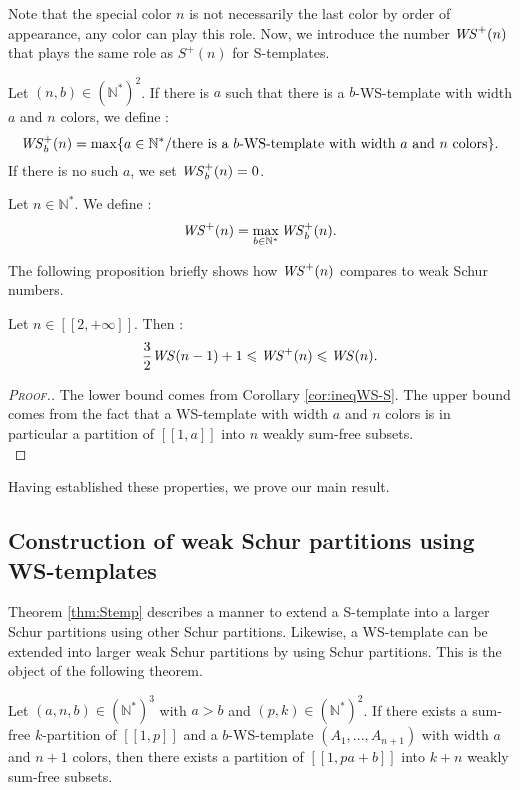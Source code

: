 Note that the special color \(n\) is not necessarily the last color by order of appearance, any color can play this role.
Now, we introduce the number \(\mathit{WS}^+(n)\) that plays the same role as \(S^+(n)\) for S-templates. 

\begin{definition}
Let \( (n,b) \in (\mathbb{N}^*)^2\). If there is \(a\) such that there is a \(b\)-WS-template with width \(a\)
and \(n\) colors, we define :
\[
\mathit{WS}_b^+(n)= \max \{a \in \mathbb{N}^*/ \text{there is a } b \text{-WS-template with width } a \text{ and } n \text{ colors} \}.
\]
If there is no such \(a\), we set \(\mathit{WS}_b^+(n) = 0\).
\end{definition}

\begin{definition}
Let \( n \in \mathbb{N}^*\). We define :
\[
\mathit{WS}^+(n)=\max_{b\in \mathbb{N}^*} \mathit{WS}_b^+(n).
\]
\end{definition}
The following proposition briefly shows how \(\mathit{WS}^+(n)\) compares to weak Schur numbers.
\begin{proposition}
Let \(n \in [\![2, +\infty]\!]\). Then :
\[
\frac{3}{2} \mathit{WS} (n-1)+1 \leqslant \mathit{WS}^+(n) \leqslant \mathit{WS} (n).
\]
\end{proposition}

\begin{proof}[\textsc{Proof.}]
The lower bound comes from Corollary \ref{cor:ineqWS-S}.
The upper bound comes from the fact that a WS-template with width \(a\) and \(n\) colors is in particular a partition of
\([\![1, a]\!]\) into \(n\) weakly sum-free subsets. \\
\end{proof}

Having established these properties, we prove our main result.

\subsection{Construction of weak Schur partitions using WS-templates}
\label{ConstructionWS}

Theorem \ref{thm:Stemp} describes a manner to extend a S-template into a larger Schur partitions using other Schur 
partitions. Likewise, a WS-template can be extended into larger weak Schur partitions by using Schur partitions. This 
is the object of the following theorem.

\begin{theorem}
\label{thm:WStemp}
Let \((a,n,b) \in (\mathbb{N}^*)^3\) with \(a > b\) and \( (p,k) \in (\mathbb{N}^*)^2\). If there exists a sum-free \(k\)-partition of
\([\![1,p]\!]\) and a \(b\)-WS-template \((A_1,...,A_{n+1})\) with width \(a\) and \(n+1\) colors,
then there exists a partition of \([\![1, p a + b]\!]\) into \(k+n\) weakly sum-free subsets.
\end{theorem}

